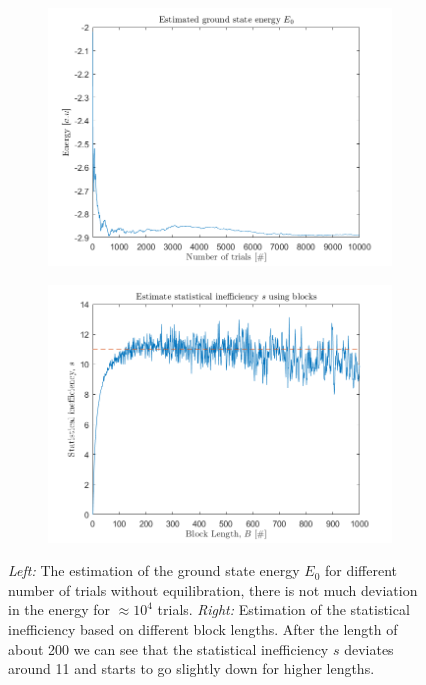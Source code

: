 \begin{figure}[H]
	\centering
	\captionsetup[subfigure]{justification=centering}
	\begin{subfigure}[b]{0.4\textwidth}
		\centering
		\includegraphics[width=\textwidth]{graphics/task2/local_energy.png}
	\end{subfigure}
	\begin{subfigure}[b]{0.4\textwidth}
		\centering
		\includegraphics[width=\textwidth]{graphics/task2/block_error.png}
	\end{subfigure}
	\caption{\textit{Left:} The estimation of the ground state energy $E_0$ for different number of trials without equilibration, there is not much deviation in the energy for $\approx10^4$ trials. \textit{Right:} Estimation of the statistical inefficiency based on different block lengths. After the length of about 200 we can see that the statistical inefficiency $s$ deviates around 11 and starts to go slightly down for higher lengths.}
	\label{fig:block_error}
\end{figure}

